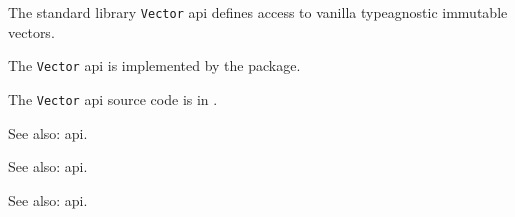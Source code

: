 
The standard library {\tt Vector} api defines access to vanilla typeagnostic immutable vectors.

The {\tt Vector} api is implemented by the 
package.

The {\tt Vector} api source code is in .

See also:   api.

See also:   api.

See also:   api.

